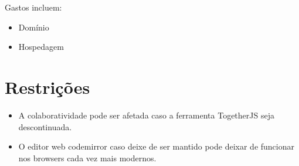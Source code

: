 Gastos incluem:

\begin{itemize}
\item
  Domínio
\item
  Hospedagem
\end{itemize}
\section{Restrições}

\begin{itemize}
\item
  A colaboratividade pode ser afetada caso a ferramenta TogetherJS seja
  descontinuada.
\item
  O editor web codemirror caso deixe de ser mantido pode deixar de
  funcionar nos browsers cada vez mais modernos.
\end{itemize}
